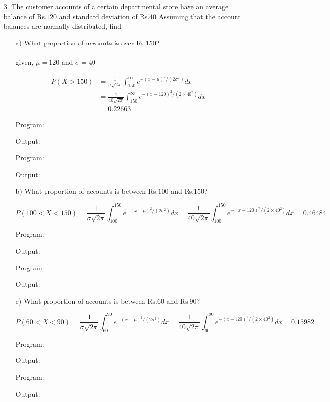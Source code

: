 \documentclass[a4paper,10pt,openright]{report}
\begin{document}
\begin{enumerate}
\item[3.] The customer accounts of a certain departmental store have an average balance of
Rs.$120$ and standard deviation of Rs.$40$ Assuming that the account balances are normally
distributed, find

\begin{enumerate}

\item[a)] What proportion of accounts is over Rs.$150$? \\ \\
given, $\mu = 120$ and $\sigma = 40$

\begin{equation*}
\begin{split}
P(X > 150) &= \frac{1}{\sigma\sqrt{2\pi}} \int_{150}^{\infty} e^{-(x-\mu)^2/(2\sigma^{2})} dx \\
		   &= \frac{1}{40\sqrt{2\pi}} \int_{150}^{\infty} e^{-(x-120)^2/(2 \times 40^{2})} dx \\
		   &= 0.22663
\end{split}
\end{equation*}

Program:

Output:


Program:

Output:


\item[b)] What proportion of accounts is between Rs.$100$ and Rs.$150$?

\begin{equation*}
P(100 < X < 150) = \frac{1}{\sigma\sqrt{2\pi}} \int_{100}^{150} e^{-(x-\mu)^2/(2\sigma^{2})} dx 
		= \frac{1}{40\sqrt{2\pi}} \int_{100}^{150} e^{-(x-120)^2/(2 \times 40^{2})} dx 
		= 0.46484
\end{equation*}

Program:

Output:


Program:

Output:


\item[c)] What proportion of accounts is between Rs.$60$ and Rs.$90$?

\begin{equation*}
P(60 < X < 90) = \frac{1}{\sigma\sqrt{2\pi}} \int_{60}^{90} e^{-(x-\mu)^2/(2\sigma^{2})} dx 
		= \frac{1}{40\sqrt{2\pi}} \int_{60}^{90} e^{-(x-120)^2/(2 \times 40^{2})} dx 
		= 0.15982
\end{equation*}

Program:

Output:


Program:

Output:

\end{enumerate}

\end{enumerate}
\end{document}
